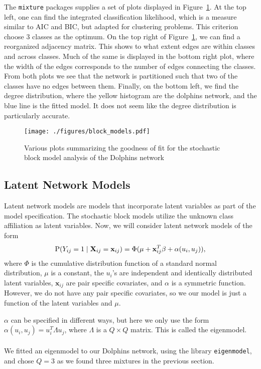 \documentclass[11pt,a4paper]{article}
\begin{document}
The \verb+mixture+ packages supplies a set of plots displayed in Figure~\ref{fig:block_models}. At the top left, one can find the integrated classification likelihood, which is a measure similar to AIC and BIC, but adapted for clustering problems. This criterion choose 3 classes as the optimum. On the top right of Figure~\ref{fig:block_models}, we can find a reorganized adjacency matrix. This shows to what extent edges are within classes and across classes. Much of the same is displayed in the bottom right plot, where the width of the edges corresponds to the number of edges connecting the classes. From both plots we see that the network is partitioned such that two of the classes have no edges between them. 
Finally, on the bottom left, we find the degree distribution, where the yellow histogram are the dolphins network, and the blue line is the fitted model. It does not seem like the degree distribution is particularly accurate.
%
\begin{figure}[h!tbp]
    \begin{center}
        \texttt{[image: ./figures/block\_models.pdf]}
    \end{center}
    \caption{Various plots summarizing the goodness of fit for the stochastic block model analysis of the Dolphins network}
    \label{fig:block_models}
\end{figure}

\subsection{Latent Network Models}
Latent network models are models that incorporate latent variables as part of the model specification. The stochastic block models utilize the unknown class affiliation as latent variables. Now, we will consider latent network models of the form 
\begin{align}
    \label{eq:latent}
    \text P(Y_{ij} = 1 \mid \mathbf{X}_{ij} = \mathbf{x}_{ij}) = \Phi (\mu + \mathbf x_{ij}^T \mathbf \beta + \alpha(u_i, u_j)),
\end{align}
where $\Phi$ is the cumulative distribution function of a standard normal distribution, $\mu$ is a constant, the $u_i$'s are independent and identically distributed latent variables, $\mathbf x_{ij}$ are pair specific covariates, and $\alpha$ is a symmetric function.
However, we do not have any pair specific covariates, so we our model is just a function of the latent variables and $\mu$.

$\alpha$ can be specified in different ways, but here we only use the form $\alpha(u_i, u_j) = u_i^T \Lambda u_j$, where $\Lambda$ is a $Q \times Q$ matrix. This is called the eigenmodel.
\\
\\
We fitted an eigenmodel to our Dolphins network, using the library \verb+eigenmodel+, and chose $Q=3$ as we found three mixtures in the previous section.
\end{document}
